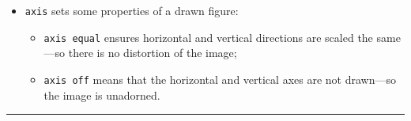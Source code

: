 \begin{table}
\begin{minipage}{\linewidth}
\begin{itemize}





\item {}\verb|axis| sets some properties of a drawn figure:
\begin{itemize}
\item \verb|axis equal| ensures horizontal and vertical directions are scaled the same---so there is no distortion of the image;
\item \verb|axis off| means that the horizontal and vertical axes are not drawn---so the image is unadorned.
\end{itemize}


\end{itemize}
\end{minipage}
\hrule
\end{table}








